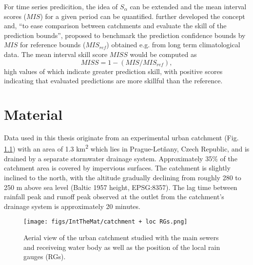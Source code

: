 \documentclass{ctuthesis}\usepackage[]{graphicx}\usepackage[]{color}
\begin{document}
For time series predicition, the idea of $S_\alpha$ can be extended and the mean interval scores ($M\!I\!S$) for a given period can be quantified. \cite{bourginTransferringGlobalUncertainty2015} further developed the concept and, \enquote{to ease comparison between catchments and evaluate the skill of the prediction bounds}, proposed to benchmark the prediction confidence bounds by $M\!I\!S$ for reference bounds ($M\!I\!S_{ref}$) obtained e.g. from long term climatological data. The mean interval skill score $M\!I\!S\!S$ would be computed as 
\begin{equation} \label{eq:MISS}
M\!I\!S\!S = 1 -  ( M\!I\!S  /  M\!I\!S_{ref} ),  
\end{equation}
high values of which indicate greater prediction skill, with positive scores indicating that evaluated predictions are more skillful than the reference.



        


\chapter{Material} \label{chap3}

Data used in this thesis originate from an experimental urban catchment (Fig. \ref{3fig1}) with an area of 1.3 km\textsuperscript{2} which lies in Prague-Letňany, Czech Republic, and is drained by a separate stormwater drainage system. Approximately 35\% of the catchment area is covered by impervious surfaces. The catchment is slightly inclined to the north, with the altitude gradually declining from roughly 280 to 250 m above sea level (Baltic 1957 height, EPSG:8357). The lag time between rainfall peak and runoff peak observed at the outlet from the catchment's drainage system is approximately 20 minutes.


\begin{figure}[H]
\begin{center}
\texttt{[image: figs/IntTheMat/catchment + loc RGs.png]}
\caption{Aerial view of the urban catchment studied with the main sewers and receiveing water body as well as the position of the local rain gauges (RGs).} \label{3fig1}
\end{center}
\end{figure}
\end{document}
